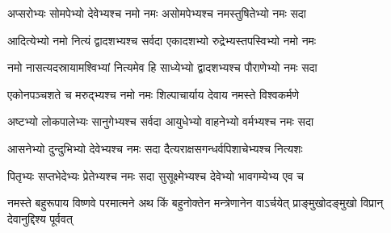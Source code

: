 \twolineshloka
{अप्सरोभ्यः सोमपेभ्यो देवेभ्यश्च नमो नमः}
{असोमपेभ्यश्च नमस्तुषितेभ्यो नमः सदा}

\twolineshloka
{आदित्येभ्यो नमो नित्यं द्वादशभ्यश्च सर्वदा}
{एकादशभ्यो रुद्रेभ्यस्तपस्विभ्यो नमो नमः}

\twolineshloka
{नमो नासत्यदस्रायामश्विभ्यां नित्यमेव हि}
{साध्येभ्यो द्वादशभ्यश्च पौराणेभ्यो नमः सदा}

\twolineshloka
{एकोनपञ्चशते च मरुद्भ्यश्च नमो नमः}
{शिल्पाचार्याय देवाय नमस्ते विश्वकर्मणे}

\twolineshloka
{अष्टभ्यो लोकपालेभ्यः सानुगेभ्यश्च सर्वदा}
{आयुधेभ्यो वाहनेभ्यो वर्मभ्यश्च नमः सदा}

\twolineshloka
{आसनेभ्यो दुन्दुभिभ्यो देवेभ्यश्च नमः सदा}
{दैत्यराक्षसगन्धर्वपिशाचेभ्यश्च नित्यशः}

\twolineshloka
{पितृभ्यः सप्तभेदेभ्यः प्रेतेभ्यश्च नमः सदा}
{सुसूक्ष्मेभ्यश्च देवेभ्यो भावगम्येभ्य एव च}

\threelineshloka
{नमस्ते बहुरूपाय विष्णवे परमात्मने}
{अथ किं बहुनोक्तेन मन्त्रेणानेन वाऽर्चयेत्}
{प्राङ्मुखोदङ्मुखो विप्रान् देवानुद्दिश्य पूर्ववत्}

\closesection